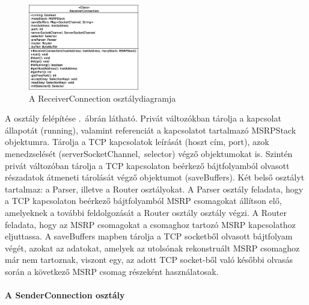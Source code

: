 \begin{figure}
  \vspace{-15pt}
  \begin{center}
    \includegraphics[width=0.43\textwidth]{img/class_diagrams/ReceiverConnection.eps}
  \end{center}
  \vspace{-15pt}
  \captionsetup{font=scriptsize}
  \caption{A ReceiverConnection osztálydiagramja}
   \label{fig:class_receiverconnection}
  \vspace{-10pt}
\end{figure}
A osztály felépítése .~ábrán látható. Privát változókban tárolja a kapcsolat állapotát (running), valamint referenciát a kapcsolatot tartalmazó MSRPStack objektumra. Tárolja a TCP kapcsolatok leírását (hoszt cím, port), azok menedzselését (\mbox{serverSocketChannel, selector}) végző objektumokat is. Szintén privát változóban tárolja a TCP kapcsolaton beérkező bájtfolyamból olvasott részadatok átmeneti tárolását végző objektumot (\mbox{saveBuffers}). Két belső osztályt tartalmaz: a Parser, illetve a Router osztályokat. A Parser osztály feladata, hogy a TCP kapcsolaton beérkező bájtfolyamból MSRP csomagokat állítson elő, amelyeknek a további feldolgozását a Router osztály osztály végzi. A Router feladata, hogy az MSRP csomagokat a csomaghoz tartozó MSRP kapcsolathoz eljuttassa. A saveBuffers mapben tárolja a TCP socketből olvasott bájtfolyam végét, azokat az adatokat, amelyek az utolsónak rekonstruált MSRP csomaghoz már nem tartoznak, viszont egy, az adott TCP socket-ből való későbbi olvasás során a következő MSRP csomag részeként használatosak.

\paragraph{A SenderConnection osztály\\}
\label{sec:msrp_senderconnection}

